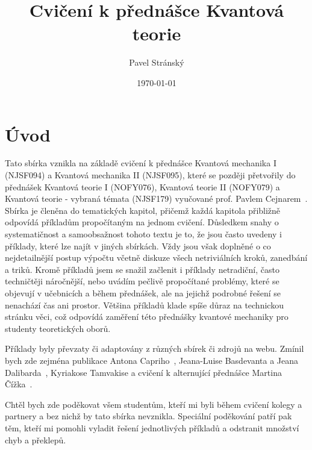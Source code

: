 \documentclass[a4paper,11pt,twoside]{article}
\def\secpage{1}
\begin{document}
\makeatletter
{}
\renewcommand{\theequation}{\arabic{section}.\arabic{subsection}.\arabic{equation}}

\ifthenelse{\equal{\secpage}{1}}
	{\renewcommand{\thepage}{\arabic{section}.\arabic{page}}}
	{}
\makeatother

\title{Cvičení k přednášce Kvantová teorie}
\date{\today}
\author{Pavel Stránský}

\maketitle
{}
\tableofcontents\np

\section*{Úvod}
Tato sbírka vznikla na základě cvičení k přednášce Kvantová mechanika I (NJSF094) a Kvantová mechanika II (NJSF095), které se později přetvořily do přednášek Kvantová teorie I (NOFY076), Kvantová teorie II (NOFY079) a Kvantová teorie - vybraná témata (NJSF179) vyučované prof. Pavlem Cejnarem~\cite{Cejnar}.
Sbírka je členěna do tematických kapitol, přičemž každá kapitola přibližně odpovídá příkladům propočítaným na jednom cvičení.
Důsledkem snahy o systematičnost a samoobsažnost tohoto textu je to, že jsou často uvedeny i příklady, které lze najít v jiných sbírkách.
Vždy jsou však doplněné o co nejdetailnější postup výpočtu včetně diskuze všech netriviálních kroků, zanedbání a triků.
Kromě příkladů  jsem se snažil začlenit i příklady netradiční, často techničtěji náročnější, nebo uvádím pečlivě propočítané problémy, které se objevují v učebnicích a během přednášek, ale na jejichž podrobné řešení se nenachází čas ani prostor.
Většina příkladů klade spíše důraz na technickou stránku věci, což odpovídá zaměření této přednášky kvantové mechaniky pro studenty teoretických oborů.

Příklady byly převzaty či adaptovány z různých sbírek či zdrojů na webu.
Zmínil bych zde zejména publikace Antona Capriho~\cite{Capri2002}, Jeana-Luise Basdevanta a Jeana Dalibarda~\cite{Basdevant2000}, Kyriakose Tamvakise\cite{Tamvakis2005} a cvičení k alternující přednášce Martina Čížka~\cite{CizekWWW1,CizekWWW2}.

Chtěl bych zde poděkovat všem studentům, kteří mi byli během cvičení kolegy a partnery a bez nichž by tato sbírka nevznikla. 
Speciální poděkování patří pak těm, kteří mi pomohli vyladit řešení jednotlivých příkladů a odstranit množství chyb a překlepů.
\end{document}
